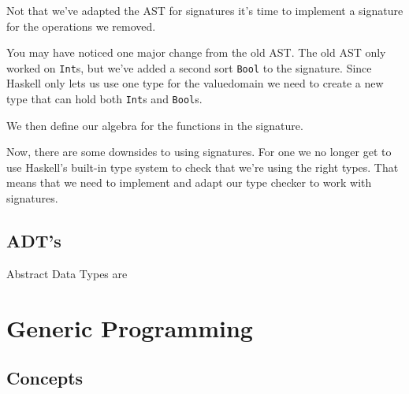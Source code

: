Not that we've adapted the AST for signatures it's time to implement a signature for the operations we removed.

\begin{figure}[!h]
    
    \label{fig:signatures:ex1:sig}
    \caption{}
\end{figure}
You may have noticed one major change from the old AST. The old AST only worked on \texttt{Int}s, but we've added a second sort \texttt{Bool} to the signature.
Since Haskell only lets us use one type for the valuedomain we need to create a new type that can hold both \texttt{Int}s and \texttt{Bool}s.

\begin{figure}[!h]
    
    \label{fig:signatures:ex1:valuedomain}
    \caption{}
\end{figure}

We then define our algebra for the functions in the signature.
\begin{figure}[!h]
    
    \label{fig:signatures:ex1:alg}
    \caption{}
\end{figure}

Now, there are some downsides to using signatures. For one we no longer get to use Haskell's built-in type system to check that we're using the right types.
That means that we need to implement and adapt our type checker to work with signatures.

\subsection{ADT's}
Abstract Data Types are

\section{Generic Programming}

\subsection{Concepts}